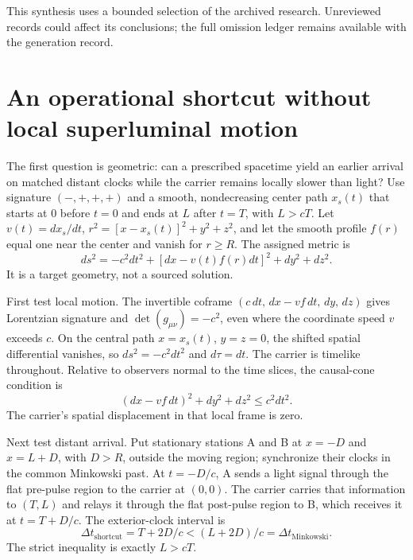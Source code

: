 \documentclass[11pt]{article}
\begin{document}
This synthesis uses a bounded selection of the archived research. Unreviewed records could affect its conclusions; the full omission ledger remains available with the generation record.
\section{An operational shortcut without local superluminal motion}
The first question is geometric: can a prescribed spacetime yield an earlier arrival on matched distant clocks while the carrier remains locally slower than light? Use signature $(-,+,+,+)$ and a smooth, nondecreasing center path $x_s(t)$ that starts at $0$ before $t=0$ and ends at $L$ after $t=T$, with $L>cT$. Let $v(t)=dx_s/dt$, $r^2=[x-x_s(t)]^2+y^2+z^2$, and let the smooth profile $f(r)$ equal one near the center and vanish for $r\geq R$. The assigned metric is \[ds^2=-c^2dt^2+[dx-v(t)f(r)dt]^2+dy^2+dz^2.\] It is a target geometry, not a sourced solution.

\begingroup\setlength{\fboxsep}{9pt}
\noindent{}\endgroup\par\medskip
First test local motion. The invertible coframe $(c\,dt,\,dx-vf\,dt,\,dy,\,dz)$ gives Lorentzian signature and $\det(g_{\mu\nu})=-c^2$, even where the coordinate speed $v$ exceeds $c$. On the central path $x=x_s(t)$, $y=z=0$, the shifted spatial differential vanishes, so $ds^2=-c^2dt^2$ and $d\tau=dt$. The carrier is timelike throughout. Relative to observers normal to the time slices, the causal-cone condition is \[(dx-vf\,dt)^2+dy^2+dz^2\leq c^2dt^2.\] The carrier's spatial displacement in that local frame is zero.

Next test distant arrival. Put stationary stations A and B at $x=-D$ and $x=L+D$, with $D>R$, outside the moving region; synchronize their clocks in the common Minkowski past. At $t=-D/c$, A sends a light signal through the flat pre-pulse region to the carrier at $(0,0)$. The carrier carries that information to $(T,L)$ and relays it through the flat post-pulse region to B, which receives it at $t=T+D/c$. The exterior-clock interval is \[\Delta t_{\mathrm{shortcut}}=T+2D/c<(L+2D)/c=\Delta t_{\mathrm{Minkowski}}.\] The strict inequality is exactly $L>cT$.
\end{document}
